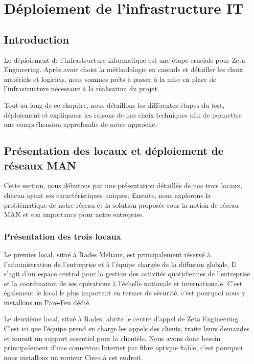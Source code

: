 \chapter{Déploiement de l'infrastructure IT}



\section{Introduction}

Le déploiement de l'infrastructure informatique est une étape cruciale pour Zeta Engineering. Après avoir choisi la méthodologie en cascade et détailler les choix matériels et logiciels, nous sommes prêts à passer à la mise en place de l'infrastructure nécessaire à la réalisation du projet.

Tout au long de ce chapitre, nous détaillons les différentes étapes du test, déploiement et expliquons les raisons de nos choix techniques afin de permettre une compréhension approfondie de notre approche.

\section{Présentation des locaux et déploiement de réseaux MAN}

Cette section, nous débutons par une présentation détaillée de nos trois locaux, chacun ayant ses caractéristiques uniques. 
Ensuite, nous explorons la problématique de notre réseau et la solution proposée sous la notion de réseau MAN et son importance pour notre entreprise. 


\subsection{Présentation des trois locaux}


Le premier local, situé à Rades Meliane, est principalement réservé à l'administration de l'entreprise et à l'équipe chargée de la diffusion globale. Il s'agit d'un espace central pour la gestion des activités quotidiennes de l'entreprise et la coordination de ses opérations à l'échelle nationale et internationale. C'est également le local le plus important en termes de sécurité, c'est pourquoi nous y installons un Pare-Feu dédié. 

Le deuxième local, situé à Rades, abrite le centre d'appel de Zeta Engineering. C'est ici que l'équipe prend en charge les appels des clients, traite leurs demandes et fournit un support essentiel pour la clientèle. Nous avons donc besoin principalement d'une connexion Internet par fibre optique fiable, c'est pourquoi nous installons un routeur Cisco à cet endroit.

